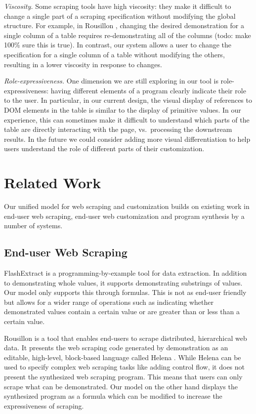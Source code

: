 \documentclass[sigconf,10pt]{acmart}
\begin{document}
\emph{Viscosity.} Some scraping tools have high viscosity: they make it
difficult to change a single part of a scraping specification without
modifying the global structure. For example, in Rousillon
\citep{chasins2018}, changing the desired demonstration for a single
column of a table requires re-demonstrating all of the columns (todo:
make 100\% sure this is true). In contrast, our system allows a user to
change the specification for a single column of a table without
modifying the others, resulting in a lower viscosity in response to
changes.

\emph{Role-expressiveness.} One dimension we are still exploring in our
tool is role-expressiveness: having different elements of a program
clearly indicate their role to the user. In particular, in our current
design, the visual display of references to DOM elements in the table is
similar to the display of primitive values. In our experience, this can
sometimes make it difficult to understand which parts of the table are
directly interacting with the page, vs.~processing the downstream
results. In the future we could consider adding more visual
differentiation to help users understand the role of different parts of
their customization.

\hypertarget{sec:related-work}{%
\section{Related Work}\label{sec:related-work}}

Our unified model for web scraping and customization builds on existing
work in end-user web scraping, end-user web customization and program
synthesis by a number of systems.

\hypertarget{end-user-web-scraping}{%
\subsection{End-user Web Scraping}\label{end-user-web-scraping}}

FlashExtract \citep{le2014} is a programming-by-example tool for data
extraction. In addition to demonstrating whole values, it supports
demonstrating substrings of values. Our model only supports this through
formulas. This is not as end-user friendly but allows for a wider range
of operations such as indicating whether demonstrated values contain a
certain value or are greater than or less than a certain value.

Rousillon \citep{chasins2018} is a tool that enables end-users to scrape
distributed, hierarchical web data. It presents the web scraping code
generated by demonstration as an editable, high-level, block-based
language called Helena \citep{zotero-179}. While Helena can be used to
specify complex web scraping tasks like adding control flow, it does not
present the synthesized web scraping program. This means that users can
only scrape what can be demonstrated. Our model on the other hand
displays the synthesized program as a formula which can be modified to
increase the expressiveness of scraping.
\end{document}
